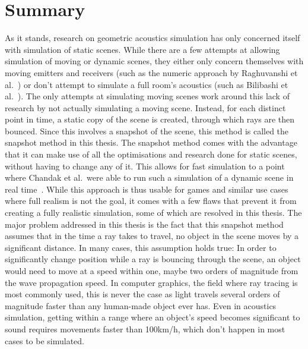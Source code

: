 \chapter{Summary}\label{ch:Summary}

As it stands, research on geometric acoustics simulation has only concerned itself with simulation of static scenes.
While there are a few attempts at allowing simulation of moving or dynamic scenes,
they either only concern themselves with moving emitters and receivers
(such as the numeric approach by Raghuvanshi et al.~\cite{RS10})
or don't attempt to simulate a full room's acoustics (such as Bilibashi et al.~\cite{BVD20}).
\newline
The only attempts at simulating moving scenes work around this lack of research by not actually simulating a moving scene.
Instead, for each distinct point in time, a static copy of the scene is created,
through which rays are then bounced.
Since this involves a snapshot of the scene, this method is called the snapshot method in this thesis.
\newline
The snapshot method comes with the advantage that it can make use of all the optimisations and research done for static scenes,
without having to change any of it.
This allows for fast simulation to a point where Chandak et al.~were able to run such a simulation of a dynamic scene in real time~\cite{Cha08}.
While this approach is thus usable for games and similar use cases where full realism is not the goal,
it comes with a few flaws that prevent it from creating a fully realistic simulation,
some of which are resolved in this thesis.
\newline
The major problem addressed in this thesis is the fact that this snapshot method assumes that in the time a ray takes to travel,
no object in the scene moves by a significant distance.
In many cases, this assumption holds true:
In order to significantly change position while a ray is bouncing through the scene,
an object would need to move at a speed within one, maybe two orders of magnitude from the wave propagation speed.
In computer graphics, the field where ray tracing is most commonly used,
this is never the case as light travels several orders of magnitude faster than any human-made object ever has.
Even in acoustics simulation, getting within a range where an object's speed becomes significant to sound
requires movements faster than 100km/h, which don't happen in most cases to be simulated.
\newline
